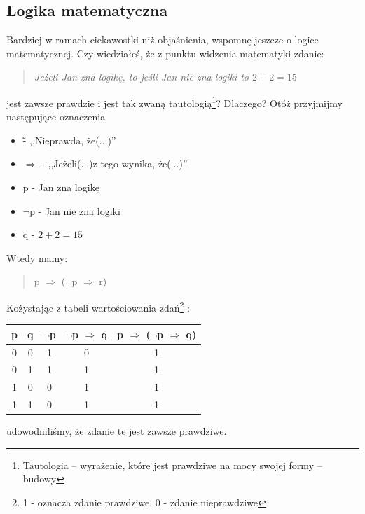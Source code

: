\documentclass[12pt, a4paper]{article}
\begin{document}
\subsection{Logika matematyczna}
Bardziej w ramach ciekawostki niż objaśnienia, wspomnę jeszcze o logice matematycznej. Czy wiedziałeś, że z punktu widzenia matematyki zdanie:
\begin{quote}
\emph{Jeżeli Jan zna logikę, to jeśli Jan nie zna logiki to $2 + 2 = 15$} 
\end{quote}
jest zawsze prawdzie i jest tak zwaną tautologią\footnote{Tautologia – wyrażenie, które jest prawdziwe na mocy swojej formy – budowy}? 
\newline Dlaczego? Otóż przyjmijmy następujące oznaczenia
\begin{itemize}
\item \~ - ,,Nieprawda, że($\ldots$)''
\item $\Rightarrow$ - ,,Jeżeli($\ldots$)z tego wynika, że($\ldots$)''
\item p - Jan zna logikę
\item $\neg$p - Jan nie zna logiki
\item q - $2 + 2 = 15$
\end{itemize}
Wtedy mamy:
\begin{quote}
p $\Rightarrow$ ($\neg$p $\Rightarrow$ r)
\end{quote}
Kożystając z tabeli wartościowania zdań\footnote{1 - oznacza zdanie prawdziwe, 0 - zdanie nieprawdziwe} :
\begin{center}
\begin{tabular}{|c|c|c|c|c|}
\hline
p & q & $\neg$p & $\neg$p $\Rightarrow$ q & p $\Rightarrow$ ($\neg$p $\Rightarrow$ q)\\\hline
0 & 0 & 1 & 0 & 1\\\hline
0 & 1 & 1 & 1 & 1\\\hline
1 & 0 & 0 & 1 & 1\\\hline
1 & 1 & 0 & 1 & 1\\\hline
\end{tabular}
\end{center}
udowodniliśmy, że zdanie te jest zawsze prawdziwe.\cite{wstep}
\newpage
\end{document}
